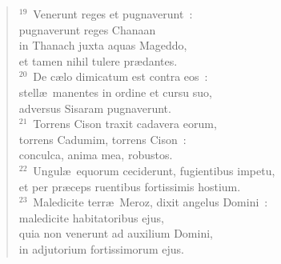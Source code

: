 \begin{flushleft}\begin{verse}${}^{19}$~Venerunt reges et pugnaverunt~:\\ pugnaverunt reges Chanaan\\ in Thanach juxta aquas Mageddo,\\ et tamen nihil tulere pr\ae dantes.\\
${}^{20}$~De c\ae lo dimicatum est contra eos~:\\ stell\ae\ manentes in ordine et cursu suo,\\ adversus Sisaram pugnaverunt.\\
${}^{21}$~Torrens Cison traxit cadavera eorum,\\ torrens Cadumim, torrens Cison~:\\ conculca, anima mea, robustos.\\
${}^{22}$~Ungul\ae\ equorum ceciderunt, fugientibus impetu,\\ et per pr\ae ceps ruentibus fortissimis hostium.\\
${}^{23}$~Maledicite terr\ae\ Meroz, dixit angelus Domini~:\\ maledicite habitatoribus ejus,\\ quia non venerunt ad auxilium Domini,\\ in adjutorium fortissimorum ejus.\end{verse}\end{flushleft}


